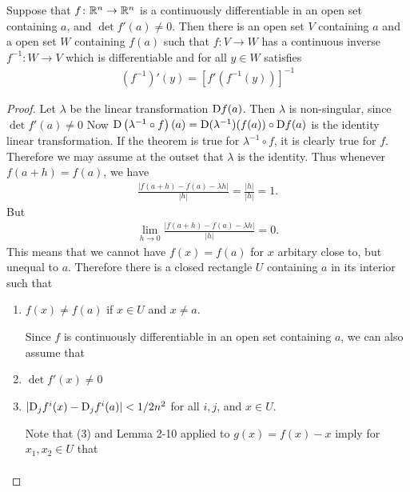 \begin{theorem}\label{theorem:2-11}
    Suppose that $f\colon{}\mathbb{R}^n\to \mathbb{R}^n$ is a continuously differentiable in an open set 
    containing $a$, and $\det f'(a)\neq 0$. Then there is an open set $V$ containing $a$ and 
    a open set $W$ containing $f(a)$ such that $f\colon{}V\to W$ has a continuous inverse $f^{-1}\colon{}W\to V$ which 
    is differentiable and for all $y\in W$ satisfies 
    \begin{align*}
        (f^{-1})'(y) = \left[f'\left(f^{-1}(y)\right)\right]^{-1}
    \end{align*}
\end{theorem}

\begin{proof}
    Let $\lambda$ be the linear transformation $\mathrm{D}f(a)$. Then $\lambda$ is non-singular,
    since $\det f'(a)\neq 0$ Now $\mathrm{D}\left(\lambda^{-1}\circ f\right)(a) = \mathrm{D}(\lambda^{-1})(f(a))\circ \mathrm{D}f(a)$
    is the identity linear transformation. If the theorem is true for $\lambda^{-1}\circ f$, it is 
    clearly true for $f$. Therefore we may assume at the outset that $\lambda$ is the identity. 
    Thus whenever $f(a+h) = f(a)$, we have 
    \begin{align*}
        \frac{\left|f(a+h) - f(a) - \lambda h\right|}{|h|}
        = \frac{|h|}{|h|}
        = 1.
    \end{align*}
    But 
    \begin{align*}
        \lim_{h\to 0}{\frac{\left|f(a+h) - f(a) - \lambda h\right|}{|h|}}
        = 0.
    \end{align*}
    This means that we cannot have $f(x)=f(a)$ for $x$ arbitary close to, but unequal to $a$.
    Therefore there is a closed rectangle $U$ containing $a$ in its interior such that 
    \begin{enumerate}[label={\textup{\arabic*.\,}}]
        \item $f(x)\neq f(a)$ if $x\in U$ and $x\neq a$.\par 
            Since $f$ is continuously differentiable in 
            an open set containing $a$, we can also assume that
        \item $\det f'(x)\neq 0$ 
        \item $|\mathrm{D}_jf^i(x) - \mathrm{D}_jf^i(a)| < 1/2n^2$ for all $i, j$, and $x\in U$.\par 
            Note that (3) and Lemma 2-10 applied to $g(x)=f(x) - x$ imply for $x_1, x_2\in U$ that 
            \begin{align*}

\end{align*}
\end{enumerate}
\end{proof}
